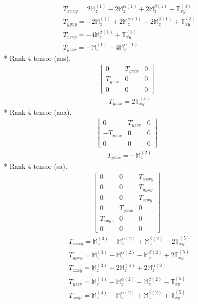 \documentclass[fleqn,8pt,landscape]{jsarticle}
\begin{document}
\begin{align*}
& T_{xxxy} = 2 \mathbb{M}_{z}^{(1)} - 2 \mathbb{M}_{z}^{\alpha(1)} + 2 \mathbb{M}_{z}^{\beta(1)} + \mathbb{T}_{xy}^{(3)} \\
& T_{yyxy} = - 2 \mathbb{M}_{z}^{(1)} + 2 \mathbb{M}_{z}^{\alpha(1)} + 2 \mathbb{M}_{z}^{\beta(1)} + \mathbb{T}_{xy}^{(3)} \\
& T_{zzxy} = - 4 \mathbb{M}_{z}^{\beta(1)} + \mathbb{T}_{xy}^{(3)} \\
& T_{yzzx} = - \mathbb{M}_{z}^{(1)} - 4 \mathbb{M}_{z}^{\alpha(1)}
\end{align*}
* Rank 4 tensor (aas).
\begin{align*}
\begin{bmatrix} 0 & T_{yzzx} & 0 \\ T_{yzzx} & 0 & 0 \\ 0 & 0 & 0 \end{bmatrix}
\end{align*}
\begin{align*}
& T_{yzzx} = 2 \mathbb{T}_{xy}^{(4)}
\end{align*}
* Rank 4 tensor (aaa).
\begin{align*}
\begin{bmatrix} 0 & T_{yzzx} & 0 \\ - T_{yzzx} & 0 & 0 \\ 0 & 0 & 0 \end{bmatrix}
\end{align*}
\begin{align*}
& T_{yzzx} = - \mathbb{M}_{z}^{(2)}
\end{align*}
* Rank 4 tensor (sa).
\begin{align*}
\begin{bmatrix} 0 & 0 & T_{xxxy} \\ 0 & 0 & T_{yyxy} \\ 0 & 0 & T_{zzxy} \\ 0 & T_{yzzx} & 0 \\ T_{zxyz} & 0 & 0 \\ 0 & 0 & 0 \end{bmatrix}
\end{align*}
\begin{align*}
& T_{xxxy} = \mathbb{M}_{z}^{(3)} - \mathbb{M}_{z}^{\alpha(2)} + \mathbb{M}_{z}^{\beta(2)} - 2 \mathbb{T}_{xy}^{(5)} \\
& T_{yyxy} = \mathbb{M}_{z}^{(3)} - \mathbb{M}_{z}^{\alpha(2)} - \mathbb{M}_{z}^{\beta(2)} + 2 \mathbb{T}_{xy}^{(5)} \\
& T_{zzxy} = \mathbb{M}_{z}^{(3)} + 2 \mathbb{M}_{z}^{(4)} + 2 \mathbb{M}_{z}^{\alpha(2)} \\
& T_{yzzx} = \mathbb{M}_{z}^{(4)} - \mathbb{M}_{z}^{\alpha(2)} - \mathbb{M}_{z}^{\beta(2)} - \mathbb{T}_{xy}^{(5)} \\
& T_{zxyz} = \mathbb{M}_{z}^{(4)} - \mathbb{M}_{z}^{\alpha(2)} + \mathbb{M}_{z}^{\beta(2)} + \mathbb{T}_{xy}^{(5)}
\end{align*}
\end{document}
